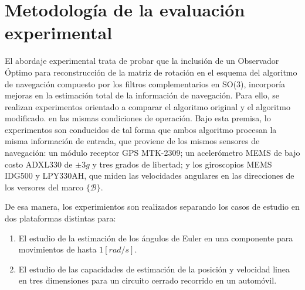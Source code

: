 \documentclass[conference]{IEEEtran}
\newcommand{\marco}[1]{\{\mathcal{#1}\}}
\begin{document}
\section{Metodología de la evaluación experimental}\label{Metodologia}
El abordaje experimental trata de probar que la inclusión de un Observador Óptimo  para reconstrucción de la matriz de rotación en el esquema del algoritmo de navegación compuesto por los filtros complementarios en SO(3), incorporía mejoras en la estimación total de la información de navegación. Para ello, se realizan experimentos orientado a comparar el algoritmo original y el algoritmo modificado. en las mismas condiciones de operación. Bajo esta premisa, lo experimentos son conducidos de tal forma que ambos algoritmo procesan la misma información de entrada, que proviene de los mismos  sensores de navegación: un módulo receptor GPS MTK-2309; un acelerómetro MEMS de bajo costo ADXL330 de $\pm3g$ y tres grados de libertad; y los giroscopios MEMS IDG500 y LPY330AH, que miden las velocidades angulares en las direcciones de los versores del marco $\marco{B}$. \par
De esa manera, los experimientos son realizados separando los casos de estudio en dos plataformas distintas para: 
\begin{enumerate}
\item El estudio de la estimación de los ángulos de Euler en una componente para movimientos de hasta $1[rad/s]$.
\item El estudio de las capacidades de estimación de la posición y velocidad linea en tres dimensiones para un circuito cerrado recorrido en un automóvil.
\end{enumerate}
\end{document}
